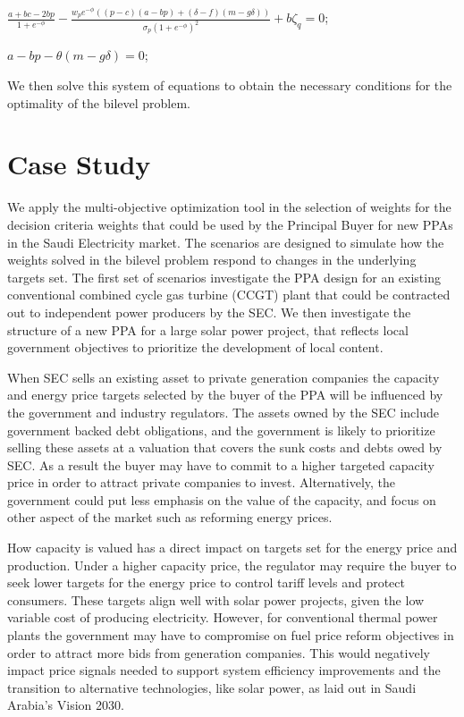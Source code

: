 \documentclass[informs]{informs3}
\begin{document}
$\frac{a+bc-2bp}{1+e^{-\phi}}-\frac{w_p e^{-\phi} \left(\left(p-c\right)(a - bp )  +\left(\delta-f\right)(m -g\delta)\right)}{\sigma_{p}(1+e^{-\phi})^{2}}+b \zeta_q =0$;

$a - bp -\theta (m -g\delta)= 0$; 

We then solve this system of equations to obtain the necessary conditions for the optimality of the bilevel problem.
\Halmos
\endproof 


\section{Case Study}\label{Section_CaseStudy}

We apply the multi-objective optimization tool in the selection of weights for the decision criteria weights that could be used by the Principal Buyer for new PPAs in the Saudi Electricity market. The scenarios are designed to simulate how the weights solved in the bilevel problem respond to changes in the underlying targets set.  The first set of scenarios investigate the PPA design for an existing conventional combined cycle gas turbine (CCGT) plant that could be contracted out to independent power producers by the SEC. We then investigate the structure of a new PPA for a large solar power project, that reflects local government objectives to prioritize the development of local content. 

When SEC sells an existing asset to private generation companies the  capacity and energy price targets selected by the buyer of the PPA will be influenced by the government and industry regulators. The assets owned by the SEC include government backed debt obligations, and the government is likely to prioritize selling these assets at a valuation that covers the sunk costs and debts owed by SEC. As a result the buyer may have to commit to a higher targeted capacity price in order to attract private companies to invest. Alternatively, the government could put less emphasis on the value of the capacity, and focus on other aspect of the market such as reforming energy prices.
 
How capacity is valued has a direct impact on targets set for the energy price and production. Under a higher capacity price, the regulator may require the buyer to seek lower targets for the energy price to control tariff levels and protect consumers. These targets align well with solar power projects, given the low variable cost of producing electricity. However, for conventional thermal power plants the government may have to compromise on fuel price reform objectives in order to attract more bids from generation companies. This would negatively impact price signals needed to support system efficiency improvements and the transition to alternative technologies, like solar power, as laid out in Saudi Arabia’s Vision 2030. 
\end{document}
